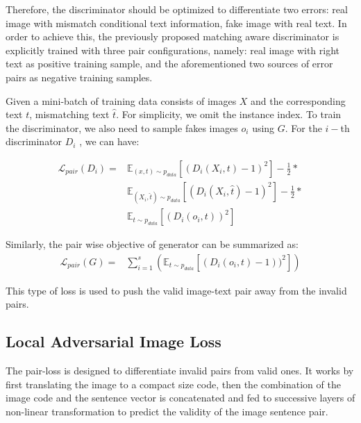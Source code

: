 \documentclass[10pt,twocolumn,letterpaper]{article}
\begin{document}
Therefore, the discriminator should be optimized to differentiate two errors: real image with mismatch conditional text information, fake image with real text. In order to achieve this, the previously proposed matching aware discriminator is explicitly trained with three pair configurations, namely: real image with right text as positive training sample, and the aforementioned two sources of error pairs as negative training samples. 

Given a mini-batch of training data consists of images $X$ and the corresponding text $t$, mismatching text $\hat{t}$. For simplicity, we omit the instance index.  To train the discriminator,  we also need to sample fakes images $o_i$ using $G$. For the $i-$th discriminator $D_i$ , we can have:

\begin{equation}
\label{equ:matchignloss}
\begin{split}
\mathcal{L}_{pair}(D_i)  = & \mathbb{E}_{(x, t) \sim p_{data}}[(D_i( {X_i},  {t}) - 1) ^ 2 ] - \frac{1}{2}*\\ 
&   \mathbb{E}_{(X_i, \hat{t}) \sim p_{data}}[(D_i({X_i}, \hat{{t}}) - 1)^2  ] - \frac{1}{2} *\\
&   \mathbb{E}_{t \sim p_{data}}[ (D_i( {o}_i, {t}))^2 ]  
\end{split}
\end{equation}

Similarly, the pair wise objective of generator can be summarized as:
\begin{equation}
\label{equ:pariG}
\begin{split}
\mathcal{L}_{pair}(G)  = & \sum_{i=1}^{s} ( \mathbb{E}_{t \sim p_{data}}[ (D_i( {o}_i, {t}) - 1) )^2 ] )
\end{split}
\end{equation}

This type of loss is used to push the valid image-text pair away from the invalid pairs.

\subsection{Local Adversarial Image Loss}

The pair-loss is designed to differentiate invalid pairs from valid ones.
It works by first translating the image to a compact size code, then the combination of the image code and the sentence vector is concatenated and fed to successive layers of non-linear transformation  to predict the validity of the image sentence pair. 
\end{document}
